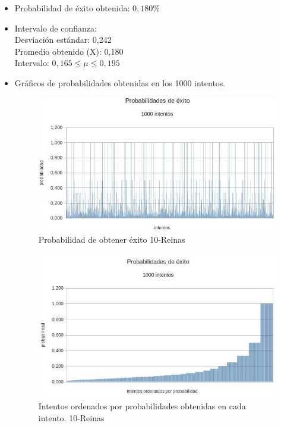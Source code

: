 \documentclass[a4paper,10pt]{article}
\begin{document}
\begin{itemize}
 \item Probabilidad de éxito obtenida: $0,180\%$
 \item Intervalo de confianza: \\
  Desviación estándar: 0,242 \\
  Promedio obtenido (X): 0,180\\
  Intervalo: $ 0,165 \leq \mu \leq 0,195$ \\
 \item Gráficos de probabilidades obtenidas en los 1000 intentos.

\begin{figure}
 \centering
 \includegraphics[scale=0.5]{probabilidad10.jpg}
 \caption{Probabilidad de obtener éxito 10-Reinas}
 \label{fig:probabilidad10}
\end{figure}

\begin{figure}
 \centering
 \includegraphics[scale=0.5]{probabilidadOrden10.jpg}
 \caption{Intentos ordenados por probabilidades obtenidas en cada intento. 10-Reinas}
 \label{fig:probaOrd10}
\end{figure}


\end{itemize}
\end{document}
